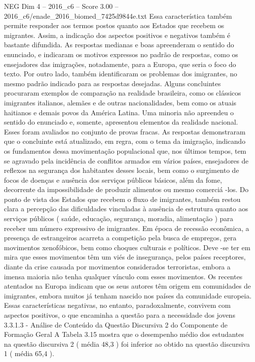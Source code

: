 \begin{textsample}{NEG Dim 4 – 2016\_c6 – Score 3.00 – 2016\_c6/enade\_2016\_biomed\_7425d9844e.txt}
Essa característica também permite responder aos termos postos quanto aos Estados que recebem os migrantes.
Assim, a indicação dos aspectos positivos e negativos também é bastante difundida.
As respostas medianas e boas apreenderam o sentido do enunciado, e indicaram os motivos expressos no padrão de respostas, como os ensejadores das imigrações, notadamente, para a Europa, que seria o foco do texto.
Por outro lado, também identificaram os problemas dos imigrantes, no mesmo padrão indicado para as respostas desejadas.
Alguns concluintes procuraram exemplos de comparação na realidade brasileira, como os clássicos imigrantes italianos, alemães e de outras nacionalidades, bem como os atuais haitianos e demais povos da América Latina.
Uma minoria não apreendeu o sentido do enunciado e, somente, apresentou elementos da realidade nacional.
Esses foram avaliados no conjunto de provas fracas.
As respostas demonstraram que o concluinte está atualizado, em regra, com o tema da imigração, indicando os fundamentos dessa movimentação populacional que, nos últimos tempos, tem se agravado pela incidência de conflitos armados em vários países, ensejadores de reflexos na segurança dos habitantes desses locais, bem como o surgimento de focos de doenças e ausência dos serviços públicos básicos, além da fome, decorrente da impossibilidade de produzir alimentos ou mesmo comerciá -los.
Do ponto de vista dos Estados que recebem o fluxo de imigrantes, também restou clara a percepção das dificuldades vinculadas à ausência de estrutura quanto aos serviços públicos ( saúde, educação, segurança, moradia, alimentação ) para receber um número expressivo de imigrantes.
Em época de recessão econômica, a presença de estrangeiros acarreta a competição pela busca de empregos, gera movimentos xenofóbicos, bem como choques culturais e políticos.
Deve -se ter em mira que esses movimentos têm um viés de insegurança, pelos países receptores, diante da crise causada por movimentos considerados terroristas, embora a imensa maioria não tenha qualquer vínculo com esses movimentos.
Os recentes atentados na Europa indicam que os seus autores têm origem em comunidades de imigrantes, embora muitos já tenham nascido nos países da comunidade europeia.
Essas características negativas, no entanto, paradoxalmente, convivem com aspectos positivos, o que encaminha a questão para a necessidade dos jovens 3.3.1.3 - Análise de Conteúdo da Questão Discursiva 2 do Componente de Formação Geral A Tabela 3.15 mostra que o desempenho médio dos estudantes na questão discursiva 2 ( média 48,3 ) foi inferior ao obtido na questão discursiva 1 ( média 65,4 ).

\end{textsample}
